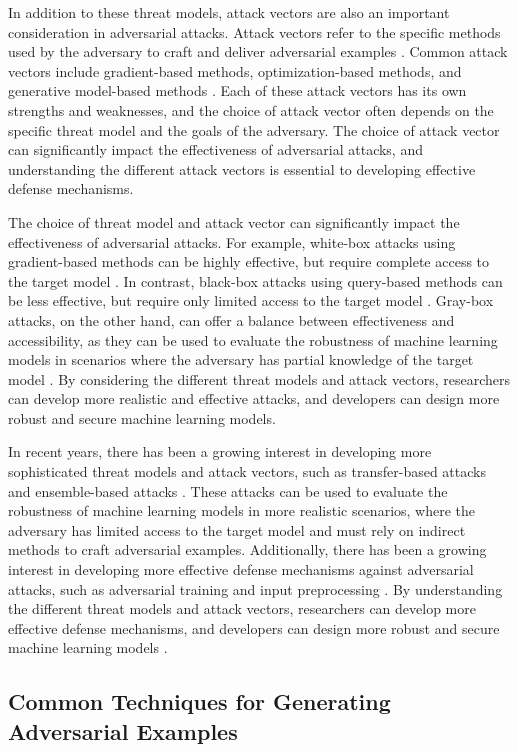 \documentclass[11pt]{article}
\begin{document}
In addition to these threat models, attack vectors are also an important consideration in adversarial attacks. Attack vectors refer to the specific methods used by the adversary to craft and deliver adversarial examples \cite{ref45}. Common attack vectors include gradient-based methods, optimization-based methods, and generative model-based methods \cite{ref46}. Each of these attack vectors has its own strengths and weaknesses, and the choice of attack vector often depends on the specific threat model and the goals of the adversary. The choice of attack vector can significantly impact the effectiveness of adversarial attacks, and understanding the different attack vectors is essential to developing effective defense mechanisms.

The choice of threat model and attack vector can significantly impact the effectiveness of adversarial attacks. For example, white-box attacks using gradient-based methods can be highly effective, but require complete access to the target model \cite{ref47}. In contrast, black-box attacks using query-based methods can be less effective, but require only limited access to the target model \cite{ref48}. Gray-box attacks, on the other hand, can offer a balance between effectiveness and accessibility, as they can be used to evaluate the robustness of machine learning models in scenarios where the adversary has partial knowledge of the target model \cite{ref49}. By considering the different threat models and attack vectors, researchers can develop more realistic and effective attacks, and developers can design more robust and secure machine learning models.

In recent years, there has been a growing interest in developing more sophisticated threat models and attack vectors, such as transfer-based attacks and ensemble-based attacks \cite{ref50}. These attacks can be used to evaluate the robustness of machine learning models in more realistic scenarios, where the adversary has limited access to the target model and must rely on indirect methods to craft adversarial examples. Additionally, there has been a growing interest in developing more effective defense mechanisms against adversarial attacks, such as adversarial training and input preprocessing \cite{ref51}. By understanding the different threat models and attack vectors, researchers can develop more effective defense mechanisms, and developers can design more robust and secure machine learning models \cite{ref52}.

\subsection{Common Techniques for Generating Adversarial Examples}
\end{document}
